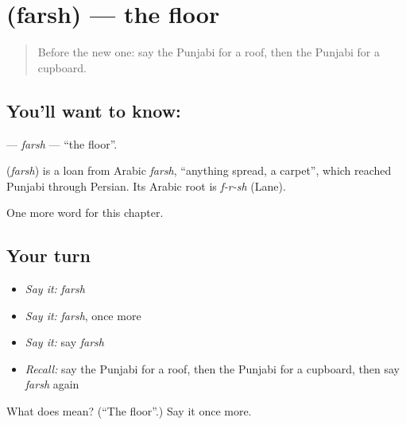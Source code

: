 \section[\texorpdfstring{\pa{ਫ਼ਰਸ਼} (farsh)}{ਫ਼ਰਸ਼ (farsh)}]{ (farsh) — the floor}

\label{lesson:PA-C68-farsh}



\begin{quote}
Before the new one: say the Punjabi for a roof, then the Punjabi for a cupboard.
\end{quote}

\subsection*{You'll want to know: }
\textbf{} — \emph{farsh} — \textquotedblleft{}the floor\textquotedblright{}.

\begin{cousinweb}
\textbf{} (\emph{farsh}) is a loan from Arabic \emph{farsh}, \textquotedblleft{}anything spread, a carpet\textquotedblright{}, which reached Punjabi through Persian. Its Arabic root is \emph{f-r-sh} (Lane).
\end{cousinweb}

\begin{grammarlens}[title={What you've built}]
One more word for this chapter.
\end{grammarlens}

\subsection*{Your turn}
\begin{itemize}
\raggedright
  \item \emph{Say it:} \emph{farsh}
  \item \emph{Say it:} \emph{farsh}, once more
  \item \emph{Say it:} say \emph{farsh}
  \item \emph{Recall:} say the Punjabi for a roof, then the Punjabi for a cupboard, then say \emph{farsh} again
\end{itemize}

\begin{tcolorbox}[breakable,colback=teal!4,colframe=teal!35!black,title={Before you move on}]
What does  mean? (\textquotedblleft{}The floor\textquotedblright{}.) Say it once more.
\end{tcolorbox}
